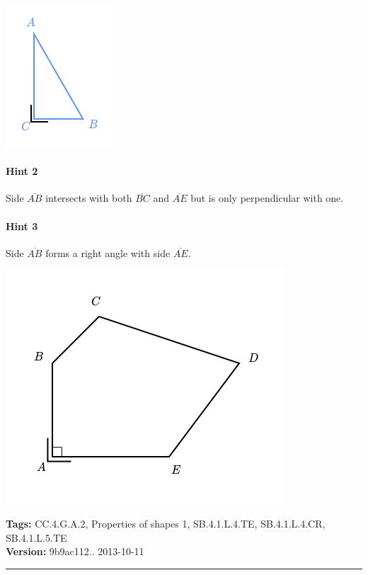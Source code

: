 \documentclass[twocolumn,10pt]{article}
\def\shrinkfactor{0.55}
\begin{document}
\includegraphics[scale=\shrinkfactor]{figures/497661f48f441186b5e021d8ca8c4f0c7449214f.png}

\paragraph{Hint 2}Side $\overline{AB}$ intersects with both $\overline{BC}$ and $\overline{AE}$ but is only perpendicular with one.

\paragraph{Hint 3}Side $\overline{AB}$ forms a right angle with side $\overline{AE}$.

\includegraphics[scale=\shrinkfactor]{figures/ac2de68945d2c7eea7f72f353d3f700df291dd2d.png}



\medskip
\noindent
\textbf{Tags:} {\footnotesize CC.4.G.A.2, Properties of shapes 1, SB.4.1.L.4.TE, SB.4.1.L.4.CR, SB.4.1.L.5.TE}\\
\textbf{Version:} 9b9ac112.. 2013-10-11
\smallskip\hrule
\end{document}
